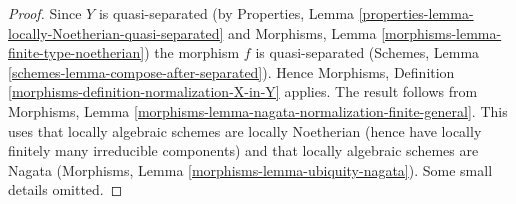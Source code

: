 \documentclass[10pt,a4paper]{amsart}
\theoremstyle{plain}
\theoremstyle{definition}
\theoremstyle{remark}
\numberwithin{equation}{subsection}
\begin{document}
\begin{proof}
Since $Y$ is quasi-separated (by
Properties, Lemma \ref{properties-lemma-locally-Noetherian-quasi-separated} and
Morphisms, Lemma \ref{morphisms-lemma-finite-type-noetherian})
the morphism $f$ is quasi-separated
(Schemes, Lemma \ref{schemes-lemma-compose-after-separated}).
Hence Morphisms, Definition \ref{morphisms-definition-normalization-X-in-Y}
applies. The result follows from Morphisms, Lemma
\ref{morphisms-lemma-nagata-normalization-finite-general}.
This uses that locally algebraic schemes are locally Noetherian
(hence have locally finitely many irreducible components)
and that locally algebraic schemes are Nagata
(Morphisms, Lemma \ref{morphisms-lemma-ubiquity-nagata}).
Some small details omitted.
\end{proof}
\end{document}
